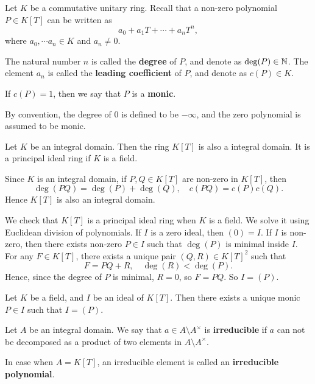 \begin{definitionenv}
    Let $K$ be a commutative unitary ring.
    Recall that a non-zero polynomial $P \in K[T]$ can be written as
    $$a_0 + a_1 T +\cdots + a_n T^n,$$
    where $a_0,\cdots a_n \in K$ and $a_n \neq 0$.
    
    \quad The natural number $n$ is called the \textbf{degree} of $P$, and denote as $\deg (P) \in \mathbb{N}$.
    The element $a_n$ is called the \textbf{leading coefficient} of $P$, and denote as $c(P) \in K$.

    \quad If $c(P) = 1$, then we say that $P$ is a \textbf{monic}.

    \quad By convention, the degree of $0$ is defined to be $-\infty$,
    and the zero polynomial is assumed to be monic.
\end{definitionenv}

\begin{propositionenv}
    Let $K$ be an integral domain.
    Then the ring $K[T]$ is also a integral domain.
    It is a principal ideal ring if $K$ is a field.
\end{propositionenv}
\begin{proofenv}
    Since $K$ is an integral domain, if $P,Q \in K[T]$ are non-zero in $K[T]$, then
    $$\deg (PQ) = \deg (P) + \deg (Q),\quad c(PQ) = c(P)c(Q).$$
    Hence $K[T]$ is also an integral domain.

    \quad We check that $K[T]$ is a principal ideal ring when $K$ is a field.
    We solve it using Euclidean division of polynomials.
    If $I$ is a zero ideal, then $(0) = I$.
    If $I$  is non-zero, then there exists non-zero $P \in I$ such that $\deg(P)$ is minimal inside $I$.
    For any $F \in K[T]$, there exists a unique pair $(Q,R) \in K[T]^2$ such that 
    $$F = PQ + R, \quad \deg(R) < \deg(P).$$
    Hence, since the degree of $P$ is minimal, $R = 0$, so $F = PQ$.
    So $I = (P)$.
\end{proofenv}

\begin{remark}
    Let $K$ be a field,
    and $I$ be an ideal of $K[T]$.
    Then there exists a unique monic $P \in I$ such that $I = (P)$.
\end{remark}

\begin{definitionenv}
    Let $A$ be an integral domain.
    We say that $a \in A\setminus A^\times$ is \textbf{irreducible} if $a$ can not be decomposed as a product of two elements in $A\setminus A^\times$.

    \quad In case when $A = K[T]$,
    an irreducible element is called an \textbf{irreducible polynomial}.
\end{definitionenv}

